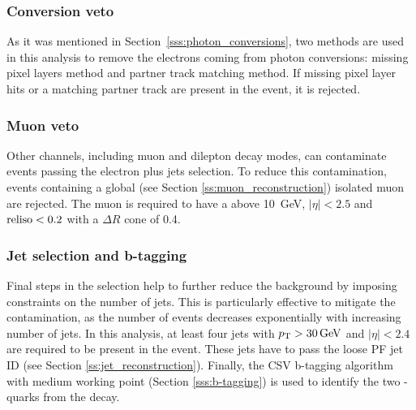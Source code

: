 
\subsubsection*{Conversion veto}
As it was mentioned in Section~\ref{sss:photon_conversions}, two methods are used in this analysis to remove the
electrons coming from photon conversions: missing pixel layers method and partner track matching method. If missing
pixel layer hits or a matching partner track are present in the event, it is rejected.

\subsubsection*{Muon veto}
Other \ttbar channels, including muon and dilepton decay modes, can contaminate events passing the electron plus jets
selection. To reduce this contamination, events containing a global (see Section \ref{ss:muon_reconstruction}) isolated
muon are rejected. The muon is required to have a \pt above \SI{10}{\GeV}, $|\eta| < 2.5$ and $\textrm{reliso} < 0.2$ with a
$\Delta R$ cone of \num{0.4}.

\subsubsection*{Jet selection and b-tagging}
Final steps in the selection help to further reduce the background by imposing constraints on the number of jets. This
is particularly effective to mitigate the \WpJets contamination, as the number of \WpJets events decreases exponentially
with increasing number of jets. In this analysis, at least four jets with $\pt > \SI{30}{\GeV}$ and $|\eta| < 2.4$ are
required to be present in the event. These jets have to pass the loose PF jet ID (see Section
\ref{ss:jet_reconstruction}). Finally, the CSV b-tagging algorithm with medium working point (Section
\ref{sss:b-tagging}) is used to identify the two \cPqb-quarks from the \ttbar decay.

